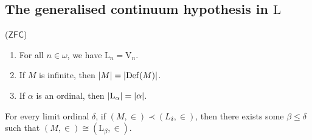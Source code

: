 \subsection{The generalised continuum hypothesis in \texorpdfstring{\( \mathrm{L} \)}{L}}
\begin{lemma}
    (\( \mathsf{ZFC} \))
    \begin{enumerate}
        \item For all \( n \in \omega \), we have \( \mathrm{L}_n = \mathrm{V}_n \).
        \item If \( M \) is infinite, then \( \abs{M} = \abs{\operatorname{Def}(M)} \).
        \item If \( \alpha \) is an ordinal, then \( \abs{\mathrm{L}_\alpha} = \abs{\alpha} \).
    \end{enumerate}
\end{lemma}
\begin{lemma}
    For every limit ordinal \( \delta \), if \( (M, \in) \prec (L_\delta, \in) \), then there exists some \( \beta \leq \delta \) such that \( (M, \in) \cong (\mathrm{L}_\beta, \in) \).
\end{lemma}
